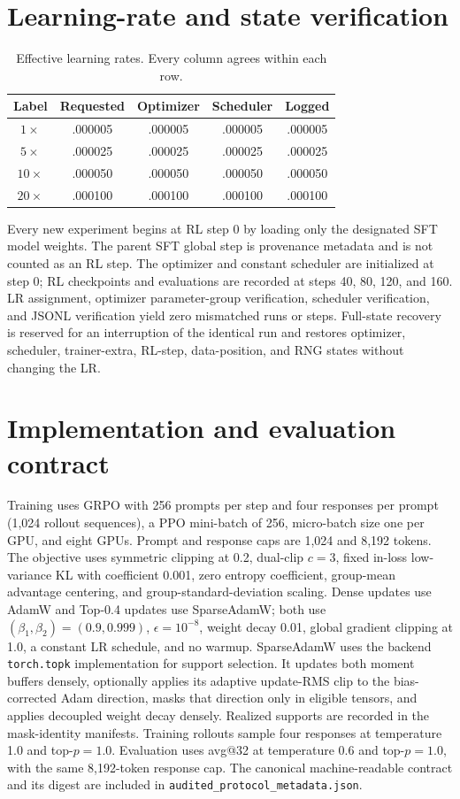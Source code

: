 \documentclass[5p,times]{elsarticle}
\begin{document}
\section{Learning-rate and state verification}\label{app:audit}
\begin{table}[t]
\centering
\caption{Effective learning rates. Every column agrees within each row.}
\small
\begin{tabular}{ccccc}
\toprule Label & Requested & Optimizer & Scheduler & Logged\\
\midrule
$1\times$&.000005&.000005&.000005&.000005\\
$5\times$&.000025&.000025&.000025&.000025\\
$10\times$&.000050&.000050&.000050&.000050\\
$20\times$&.000100&.000100&.000100&.000100\\
\bottomrule
\end{tabular}
\end{table}
Every new experiment begins at RL step 0 by loading only the designated SFT
model weights. The parent SFT global step is provenance metadata and is not
counted as an RL step. The optimizer and constant scheduler are initialized at
step 0; RL checkpoints and evaluations are recorded at steps 40, 80, 120, and
160. LR assignment, optimizer parameter-group verification, scheduler
verification, and JSONL verification yield zero mismatched runs or steps.
Full-state recovery is reserved for an interruption
of the identical run and restores optimizer, scheduler, trainer-extra, RL-step,
data-position, and RNG states without changing the LR.

\section{Implementation and evaluation contract}\label{app:implementation}
Training uses GRPO with 256 prompts per step and four responses per prompt
(1,024 rollout sequences), a PPO mini-batch of 256, micro-batch size one per
GPU, and eight GPUs. Prompt and response caps are 1,024 and 8,192 tokens.
The objective uses symmetric clipping at 0.2, dual-clip $c=3$, fixed in-loss
low-variance KL with coefficient 0.001, zero entropy coefficient, group-mean
advantage centering, and group-standard-deviation scaling. Dense updates use
AdamW and Top-0.4 updates use SparseAdamW; both use
$(\beta_1,\beta_2)=(0.9,0.999)$, $\epsilon=10^{-8}$, weight decay 0.01,
global gradient clipping at 1.0, a constant LR schedule, and no warmup.
SparseAdamW uses the backend \texttt{torch.topk} implementation for support
selection. It updates both moment buffers densely, optionally applies its
adaptive update-RMS clip to the bias-corrected Adam direction, masks that
direction only in eligible tensors, and applies decoupled weight decay densely.
Realized supports are recorded in the mask-identity manifests.
Training rollouts sample four responses at temperature 1.0 and top-$p=1.0$.
Evaluation uses avg@32 at temperature 0.6 and
top-$p=1.0$, with the same 8,192-token response cap. The canonical
machine-readable contract and its digest are included in
\texttt{audited\_protocol\_metadata.json}.
\end{document}
